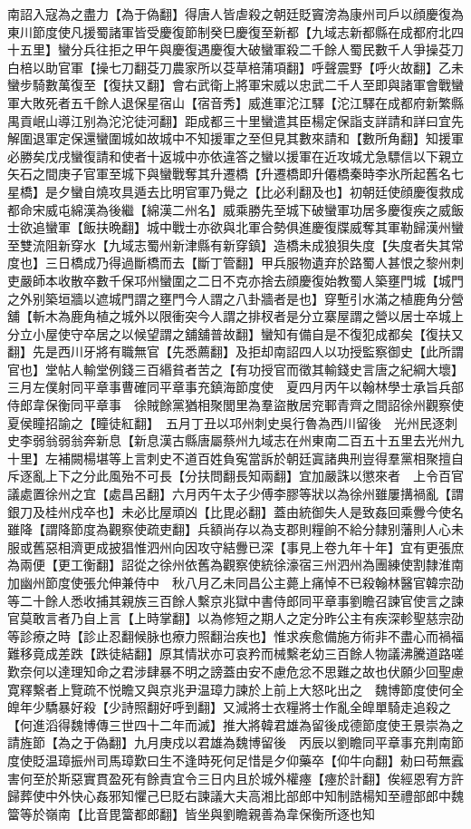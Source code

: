 南詔入寇為之盡力【為于偽翻】得唐人皆虐殺之朝廷貶竇滂為康州司戶以顔慶復為東川節度使凡援蜀諸軍皆受慶復節制癸巳慶復至新都【九域志新都縣在成都府北四十五里】蠻分兵往拒之甲午與慶復遇慶復大破蠻軍殺二千餘人蜀民數千人爭操芟刀白棓以助官軍【操七刀翻芟刀農家所以芟草棓蒲項翻】呼聲震野【呼火故翻】乙未蠻步騎數萬復至【復扶又翻】會右武衛上將軍宋威以忠武二千人至即與諸軍會戰蠻軍大敗死者五千餘人退保星宿山【宿音秀】威進軍沱江驛【沱江驛在成都府新繁縣禺貢岷山導江别為沱沱徒河翻】距成都三十里蠻遣其臣楊定保詣支詳請和詳曰宜先解圍退軍定保還蠻圍城如故城中不知援軍之至但見其數來請和【數所角翻】知援軍必勝矣戊戌蠻復請和使者十返城中亦依違答之蠻以援軍在近攻城尤急驃信以下親立矢石之間庚子官軍至城下與蠻戰奪其升遷橋【升遷橋即升僊橋秦時李氷所起舊名七星橋】是夕蠻自燒攻具遁去比明官軍乃覺之【比必利翻及也】初朝廷使顔慶復救成都命宋威屯綿漢為後繼【綿漢二州名】威乘勝先至城下破蠻軍功居多慶復疾之威飯士欲追蠻軍【飯扶晩翻】城中戰士亦欲與北軍合勢俱進慶復牒威奪其軍勒歸漢州蠻至雙流阻新穿水【九域志蜀州新津縣有新穿鎮】造橋未成狼狽失度【失度者失其常度也】三日橋成乃得過斷橋而去【斷丁管翻】甲兵服物遺弃於路蜀人甚恨之黎州刺吏嚴師本收散卒數千保邛州蠻圍之二日不克亦捨去顔慶復始教蜀人築壅門城【城門之外别築垣牆以遮城門謂之壅門今人謂之八卦牆者是也】穿塹引水滿之植鹿角分營舖【斬木為鹿角植之城外以限衝突今人謂之排杈者是分立寨屋謂之營以居士卒城上分立小屋使守卒居之以候望謂之舖舖普故翻】蠻知有備自是不復犯成都矣【復扶又翻】先是西川牙將有職無官【先悉薦翻】及拒却南詔四人以功授監察御史【此所謂官也】堂帖人輸堂例錢三百緡貧者苦之【有功授官而徵其輸錢史言唐之紀綱大壞】　三月左僕射同平章事曹確同平章事充鎮海節度使　夏四月丙午以翰林學士承旨兵部侍郎韋保衡同平章事　徐賊餘黨猶相聚閭里為羣盜散居兖鄆青齊之間詔徐州觀察使夏侯瞳招諭之【瞳徒紅翻】　五月丁丑以邛州刺史吳行魯為西川留後　光州民逐刺史李弱翁弱翁奔新息【新息漢古縣唐屬蔡州九域志在州東南二百五十五里去光州九十里】左補闕楊堪等上言刺史不道百姓負寃當訴於朝廷寘諸典刑豈得羣黨相聚擅自斥逐亂上下之分此風殆不可長【分扶問翻長知兩翻】宜加嚴誅以懲來者　上令百官議處置徐州之宜【處昌呂翻】六月丙午太子少傅李膠等狀以為徐州雖屢搆禍亂【謂銀刀及桂州戍卒也】未必比屋頑凶【比毘必翻】蓋由統御失人是致姦回乘釁今使名雖降【謂降節度為觀察使疏吏翻】兵額尚存以為支郡則糧餉不給分隸别藩則人心未服或舊惡相濟更成披猖惟泗州向因攻守結釁已深【事見上卷九年十年】宜有更張庶為兩便【更工衡翻】詔從之徐州依舊為觀察使統徐濠宿三州泗州為團練使割隸淮南　加幽州節度使張允伸兼侍中　秋八月乙未同昌公主薨上痛悼不已殺翰林醫官韓宗劭等二十餘人悉收捕其親族三百餘人繫京兆獄中書侍郎同平章事劉瞻召諫官使言之諫官莫敢言者乃自上言【上時掌翻】以為修短之期人之定分昨公主有疾深軫聖慈宗劭等診療之時【診止忍翻候脉也療力照翻治疾也】惟求疾愈備施方術非不盡心而禍福難移竟成差跌【跌徒結翻】原其情狀亦可哀矜而械繫老幼三百餘人物議沸騰道路嗟歎奈何以達理知命之君涉肆暴不明之謗蓋由安不慮危忿不思難之故也伏願少回聖慮寛釋繫者上覽疏不悦瞻又與京兆尹温璋力諫於上前上大怒叱出之　魏博節度使何全皥年少驕暴好殺【少詩照翻好呼到翻】又減將士衣糧將士作亂全皥單騎走追殺之【何進滔得魏博傳三世四十二年而滅】推大將韓君雄為留後成德節度使王景崇為之請旌節【為之于偽翻】九月庚戍以君雄為魏博留後　丙辰以劉瞻同平章事充荆南節度使貶温璋振州司馬璋歎曰生不逢時死何足惜是夕仰藥卒【仰牛向翻】勑曰苟無蠧害何至於斯惡實貫盈死有餘責宜令三日内且於城外權瘞【瘞於計翻】俟經恩宥方許歸葬使中外快心姦邪知懼己巳貶右諫議大夫高湘比部郎中知制誥楊知至禮部郎中魏簹等於嶺南【比音毘簹都郎翻】皆坐與劉瞻親善為韋保衡所逐也知